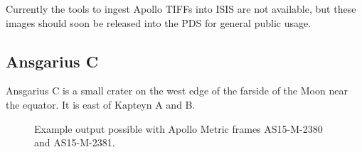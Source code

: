 Currently the tools to ingest Apollo TIFFs into ISIS are not
available, but these images should soon be released into the PDS for
general public usage.

\subsection{Ansgarius C}


Ansgarius C is a small crater on the west edge of the farside of the
Moon near the equator. It is east of Kapteyn A and B.

\begin{figure}[h!]
\centering
  \hfil
\caption{Example output possible with Apollo Metric frames AS15-M-2380 and AS15-M-2381.}
\label{fig:metric_example}
\end{figure}

